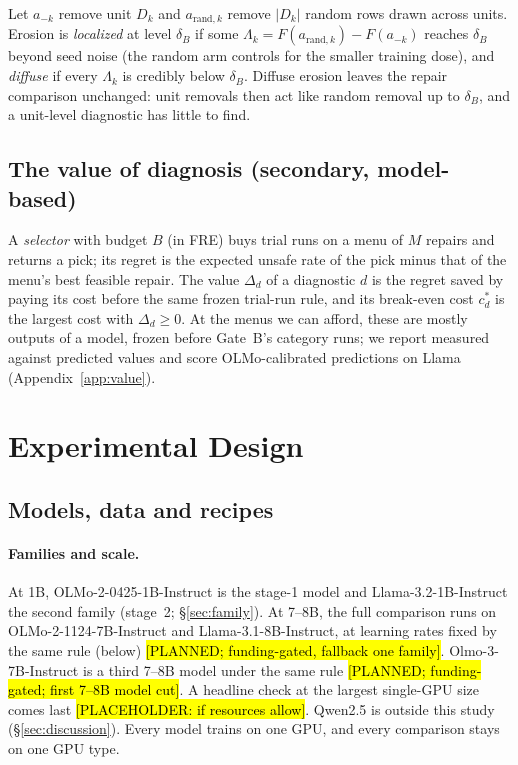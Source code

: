\documentclass{article}
\theoremstyle{plain}
\theoremstyle{definition}
\theoremstyle{remark}
\newcommand{\ph}[1]{\hl{#1}}
\begin{document}
Let $a_{-k}$ remove unit $D_k$ and $a_{\mathrm{rand},k}$ remove $|D_k|$ random
rows drawn across units. Erosion is \emph{localized} at level $\delta_B$ if
some $\Lambda_k = F(a_{\mathrm{rand},k}) - F(a_{-k})$ reaches $\delta_B$ beyond
seed noise (the random arm controls for the smaller training dose), and
\emph{diffuse} if every $\Lambda_k$ is credibly below $\delta_B$. Diffuse
erosion leaves the repair comparison unchanged: unit removals then act like
random removal up to $\delta_B$, and a unit-level diagnostic has little to
find.

\subsection{The value of diagnosis (secondary, model-based)}
\label{sec:value}

A \emph{selector} with budget $B$ (in FRE) buys trial runs on a menu of $M$
repairs and returns a pick; its regret is the expected unsafe rate of the pick
minus that of the menu's best feasible repair. The value $\Delta_d$ of a
diagnostic $d$ is the regret saved by paying its cost before the same frozen
trial-run rule, and its break-even cost $c^*_d$ is the largest cost with
$\Delta_d \ge 0$. At the menus we can afford, these are mostly outputs of a
model, frozen before Gate~B's category runs; we report measured against
predicted values and score OLMo-calibrated predictions on Llama
(Appendix~\ref{app:value}).

\section{Experimental Design}
\label{sec:design}

\subsection{Models, data and recipes}
\label{sec:models}

\paragraph{Families and scale.}
At 1B, OLMo-2-0425-1B-Instruct \citep{olmo2024olmo2} is the stage-1 model and
Llama-3.2-1B-Instruct \citep{grattafiori2024llama} the second family (stage~2;
\S\ref{sec:family}). At 7--8B, the full comparison runs on
OLMo-2-1124-7B-Instruct and Llama-3.1-8B-Instruct, at learning rates fixed by
the same rule (below) \ph{[PLANNED; funding-gated, fallback one family]}.
Olmo-3-7B-Instruct \citep{olmo2025olmo3} is a third 7--8B model under the same
rule \ph{[PLANNED; funding-gated; first 7--8B model cut]}. A headline check at
the largest single-GPU size comes last \ph{[PLACEHOLDER: if resources allow]}.
Qwen2.5 \citep{qwen2024qwen25} is outside this study
(\S\ref{sec:discussion}). Every model trains on one GPU, and every comparison
stays on one GPU type.
\end{document}
